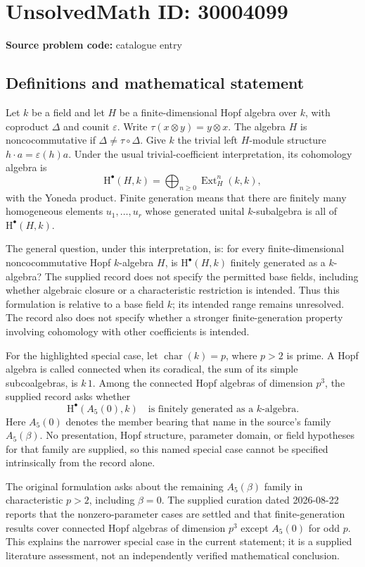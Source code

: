 \documentclass[11pt]{article}
\begin{document}
\section*{UnsolvedMath ID: 30004099}
\textbf{Source problem code:} catalogue entry
\subsection{Definitions and mathematical statement}
Let \(k\) be a field and let \(H\) be a finite-dimensional Hopf algebra over \(k\), with coproduct \(\Delta\) and counit \(\varepsilon\). Write \(\tau(x\otimes y)=y\otimes x\). The algebra \(H\) is noncocommutative if \(\Delta\ne\tau\circ\Delta\). Give \(k\) the trivial left \(H\)-module structure \(h\cdot a=\varepsilon(h)a\). Under the usual trivial-coefficient interpretation, its cohomology algebra is
\[
\mathrm H^{\bullet}(H,k)=\bigoplus_{n\geq 0}\operatorname{Ext}^{n}_{H}(k,k),
\]
with the Yoneda product. Finite generation means that there are finitely many homogeneous elements \(u_1,\ldots,u_r\) whose generated unital \(k\)-subalgebra is all of \(\mathrm H^{\bullet}(H,k)\).

The general question, under this interpretation, is: for every finite-dimensional noncocommutative Hopf \(k\)-algebra \(H\), is \(\mathrm H^{\bullet}(H,k)\) finitely generated as a \(k\)-algebra? The supplied record does not specify the permitted base fields, including whether algebraic closure or a characteristic restriction is intended. Thus this formulation is relative to a base field \(k\); its intended range remains unresolved. The record also does not specify whether a stronger finite-generation property involving cohomology with other coefficients is intended.

For the highlighted special case, let \(\operatorname{char}(k)=p\), where \(p>2\) is prime. A Hopf algebra is called connected when its coradical, the sum of its simple subcoalgebras, is \(k\,1\). Among the connected Hopf algebras of dimension \(p^3\), the supplied record asks whether
\[
\mathrm H^{\bullet}(A_5(0),k)
\quad\text{is finitely generated as a \(k\)-algebra.}
\]
Here \(A_5(0)\) denotes the member bearing that name in the source's family \(A_5(\beta)\). No presentation, Hopf structure, parameter domain, or field hypotheses for that family are supplied, so this named special case cannot be specified intrinsically from the record alone.

The original formulation asks about the remaining \(A_5(\beta)\) family in characteristic \(p>2\), including \(\beta=0\). The supplied curation dated 2026-08-22 reports that the nonzero-parameter cases are settled and that finite-generation results cover connected Hopf algebras of dimension \(p^3\) except \(A_5(0)\) for odd \(p\). This explains the narrower special case in the current statement; it is a supplied literature assessment, not an independently verified mathematical conclusion.
\end{document}
